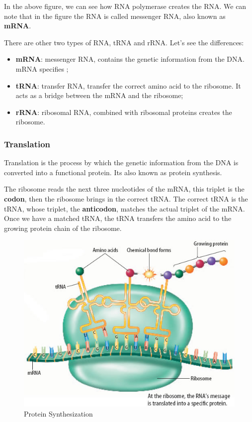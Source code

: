 In the above figure, we can see how RNA polymerase creates the RNA. We can note that in the figure the RNA is called messenger RNA, also known as \textbf{mRNA}.

There are other two types of RNA, tRNA and rRNA. Let's see the differences:
\begin{itemize}
	\item \textbf{mRNA}: messenger RNA, contains the genetic information from the DNA. mRNA specifies ;
	\item \textbf{tRNA}: transfer RNA, transfer the correct amino acid to the ribosome. It acts as a bridge between the mRNA and the ribosome;
	\item \textbf{rRNA}: ribosomal RNA, combined with ribosomal proteins creates the ribosome.
\end{itemize}
\subsubsection{Translation}
Translation is the process by which the genetic information from the DNA is converted into a functional protein. Its also known as protein synthesis.

The ribosome reads the next three nucleotides of the mRNA, this triplet is the \textbf{codon}, then the ribosome brings in the correct tRNA. The correct tRNA is the tRNA, whose triplet, the \textbf{anticodon}, matches the actual triplet of the mRNA.
Once we have a matched tRNA, the tRNA transfers the amino acid to the growing protein chain of the ribosome.

\begin{figure}[h!]
	\includegraphics[scale=.6]{res/proteins_overview/protein_synth.jpeg}
	\centering
	\caption{Protein Synthesization}
	\label{fig:protein-synth}
\end{figure}

